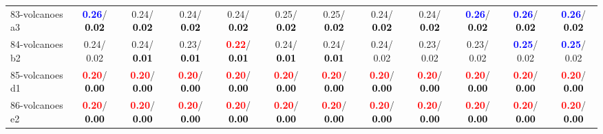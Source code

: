 \begin{table}[h]
\begin{center}
{\begin{tabular}{lc|c|c|c|c|c|c|c|c|c|c}
83-volcanoes a3 & \textcolor{blue}{\textbf{  0.26}}/\textcolor{black}{\textbf{  0.02}} &   0.24/\textcolor{black}{\textbf{  0.02}} &   0.24/\textcolor{black}{\textbf{  0.02}} &   0.24/\textcolor{black}{\textbf{  0.02}} &   0.25/\textcolor{black}{\textbf{  0.02}} &   0.25/\textcolor{black}{\textbf{  0.02}} &   0.24/\textcolor{black}{\textbf{  0.02}} &   0.24/\textcolor{black}{\textbf{  0.02}} & \textcolor{blue}{\textbf{  0.26}}/\textcolor{black}{\textbf{  0.02}} & \textcolor{blue}{\textbf{  0.26}}/\textcolor{black}{\textbf{  0.02}} & \textcolor{blue}{\textbf{  0.26}}/\textcolor{black}{\textbf{  0.02}} \\
84-volcanoes b2 &   0.24/  0.02 &   0.24/\textcolor{black}{\textbf{  0.01}} &   0.23/\textcolor{black}{\textbf{  0.01}} & \textcolor{red}{\textbf{  0.22}}/\textcolor{black}{\textbf{  0.01}} &   0.24/\textcolor{black}{\textbf{  0.01}} &   0.24/\textcolor{black}{\textbf{  0.01}} &   0.24/  0.02 &   0.23/  0.02 &   0.23/  0.02 & \textcolor{blue}{\textbf{  0.25}}/  0.02 & \textcolor{blue}{\textbf{  0.25}}/  0.02 \\
85-volcanoes d1 & \textcolor{red}{\textbf{  0.20}}/\textcolor{black}{\textbf{  0.00}} & \textcolor{red}{\textbf{  0.20}}/\textcolor{black}{\textbf{  0.00}} & \textcolor{red}{\textbf{  0.20}}/\textcolor{black}{\textbf{  0.00}} & \textcolor{red}{\textbf{  0.20}}/\textcolor{black}{\textbf{  0.00}} & \textcolor{red}{\textbf{  0.20}}/\textcolor{black}{\textbf{  0.00}} & \textcolor{red}{\textbf{  0.20}}/\textcolor{black}{\textbf{  0.00}} & \textcolor{red}{\textbf{  0.20}}/\textcolor{black}{\textbf{  0.00}} & \textcolor{red}{\textbf{  0.20}}/\textcolor{black}{\textbf{  0.00}} & \textcolor{red}{\textbf{  0.20}}/\textcolor{black}{\textbf{  0.00}} & \textcolor{red}{\textbf{  0.20}}/\textcolor{black}{\textbf{  0.00}} & \textcolor{red}{\textbf{  0.20}}/\textcolor{black}{\textbf{  0.00}} \\ \hline
86-volcanoes e2 & \textcolor{red}{\textbf{  0.20}}/\textcolor{black}{\textbf{  0.00}} & \textcolor{red}{\textbf{  0.20}}/\textcolor{black}{\textbf{  0.00}} & \textcolor{red}{\textbf{  0.20}}/\textcolor{black}{\textbf{  0.00}} & \textcolor{red}{\textbf{  0.20}}/\textcolor{black}{\textbf{  0.00}} & \textcolor{red}{\textbf{  0.20}}/\textcolor{black}{\textbf{  0.00}} & \textcolor{red}{\textbf{  0.20}}/\textcolor{black}{\textbf{  0.00}} & \textcolor{red}{\textbf{  0.20}}/\textcolor{black}{\textbf{  0.00}} & \textcolor{red}{\textbf{  0.20}}/\textcolor{black}{\textbf{  0.00}} & \textcolor{red}{\textbf{  0.20}}/\textcolor{black}{\textbf{  0.00}} & \textcolor{red}{\textbf{  0.20}}/\textcolor{black}{\textbf{  0.00}} & \textcolor{red}{\textbf{  0.20}}/\textcolor{black}{\textbf{  0.00}} \\

\end{tabular}}
\end{center}
\end{table}
